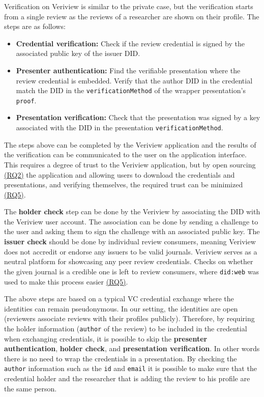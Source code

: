 Verification on Veriview is similar to the private case, but the verification starts from a single review as the reviews of a researcher are shown on their profile. The steps are as follows:

\begin{itemize}

    \item \textbf{Credential verification:} Check if the review credential is signed by the associated public key of the issuer \acrshort{DID}.
    
    \item \textbf{Presenter authentication:} Find the verifiable presentation where the review credential is embedded. Verify that the author \acrshort{DID} in the credential match the \acrshort{DID} in the \lstinline{verificationMethod} of the wrapper presentation's \lstinline{proof}.
    
    \item \textbf{Presentation verification:} Check that the presentation was signed by a key associated with the \acrshort{DID} in the presentation \lstinline{verificationMethod}.

\end{itemize}

The steps above can be completed by the Veriview application and the results of the verification can be communicated to the user on the application interface. This requires a degree of trust to the Veriview application, but by open sourcing \hyperref[rq:transparent]{(RQ2)} the application and allowing users to download the credentials and presentations, and verifying themselves, the required trust can be minimized \hyperref[rq:direct-trust]{(RQ5)}. 

The \textbf{holder check} step can be done by the Veriview by associating the \acrshort{DID} with the Veriview user account. The association can be done by sending a challenge to the user and asking them to sign the challenge with an associated public key. The \textbf{issuer check} should be done by individual review consumers, meaning Veriview does not accredit or endorse any issuers to be valid journals. Veriview serves as a neutral platform for showcasing any peer review credentials. Checks on whether the given journal is a credible one is left to review consumers, where \lstinline{did:web} was used to make this process easier \hyperref[rq:direct-trust]{(RQ5)}.

The above steps are based on a typical \acrlong{VC} credential exchange where the identities can remain pseudonymous. In our setting, the identities are open (reviewers associate reviews with their profiles publicly). Therefore, by requiring the holder information (\lstinline{author} of the review) to be included in the credential when exchanging credentials, it is possible to skip the \textbf{presenter authentication}, \textbf{holder check}, and \textbf{presentation verification}. In other words there is no need to wrap the credentials in a presentation. By checking the \lstinline{author} information such as the \lstinline{id} and \lstinline{email} it is possible to make sure that the credential holder and the researcher that is adding the review to his profile are the same person.

